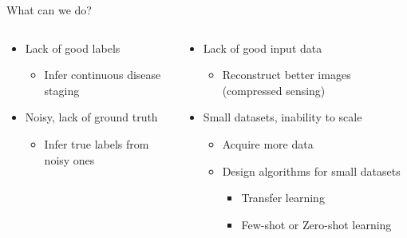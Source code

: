 \documentclass[8pt,xcolor=table]{beamer}
\begin{document}
\begin{frame}{What can we do?}


\vspace{-3em}
\begin{columns}[t]
\begin{column}{0.5\textwidth}
\centering

\begin{itemize}
\item Lack of good labels
\begin{itemize}
 \item Infer continuous disease staging
 
\end{itemize}

 \vspace{2em}
 
 \item Noisy, lack of ground truth
\begin{itemize}
   \item Infer true labels from noisy ones  
\end{itemize}

\end{itemize}

\vspace{2em}


\end{column}
\begin{column}{0.5\textwidth}
\centering


\begin{itemize}
\item Lack of good input data

\begin{itemize}
  \item Reconstruct better images (compressed sensing)
\end{itemize}

\vspace{0.5em}

\item Small datasets, inability to scale 
\begin{itemize}
\item Acquire more data
\item Design algorithms for small datasets
\begin{itemize}
 \item Transfer learning
 \item Few-shot or Zero-shot learning
\end{itemize}


\end{itemize}
\end{itemize}
\end{column}
\end{columns}
\end{frame}
\end{document}
